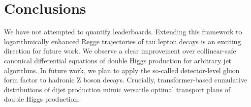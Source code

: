 \section{Conclusions}\label{sec:conclusions}

We have not attempted to quantify leaderboards. Extending this framework
to logarithmically enhanced Regge trajectories of tau lepton decays is
an exciting direction for future work. We observe a clear improvement
over collinear-safe canonical differential equations of double Higgs
production for arbitrary jet algorithms. In future work, we plan to
apply the so-called detector-level gluon form factor to hadronic Z boson
decays. Crucially, transformer-based cumulative distributions of dijet
production mimic versatile optimal transport plans of double Higgs
production.


